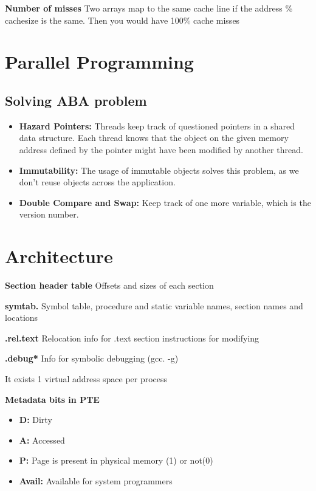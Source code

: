 \documentclass{article}
\begin{document}
\textbf{Number of misses} Two arrays map to the same cache line if the address \% cachesize is the same. Then you would have 100\% cache misses

\section{Parallel Programming}

\subsection{Solving ABA problem}

\begin{itemize}
    \item \textbf{Hazard Pointers:} Threads keep track of questioned pointers in a shared data structure. Each thread knows that the object on the given memory address defined by the pointer might have been modified by another thread.
    \item \textbf{Immutability:} The usage of immutable objects solves this problem, as we don't reuse objects across the application.
    \item \textbf{Double Compare and Swap:} Keep track of one more variable, which is the version number.
\end{itemize}

\section{Architecture}

\textbf{Section header table} Offsets and sizes of each section

\textbf{symtab.} Symbol table, procedure and static variable names, section names and locations

\textbf{.rel.text} Relocation info for .text section instructions for modifying

\textbf{.debug*} Info for symbolic debugging (gcc. -g)

It exists 1 virtual address space per process

\textbf{Metadata bits in PTE}
\begin{itemize}
    \item \textbf{D:} Dirty
    \item \textbf{A:} Accessed
    \item \textbf{P:} Page is present in physical memory (1) or not(0)
    \item \textbf{Avail:} Available for system programmers
\end{itemize}
\end{document}
